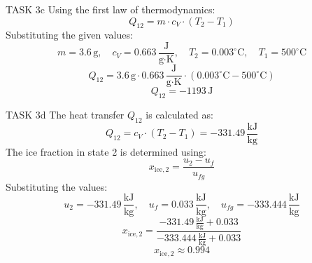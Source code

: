 TASK 3c  
Using the first law of thermodynamics:  
\[
Q_{12} = m \cdot c_V \cdot (T_2 - T_1)
\]  
Substituting the given values:  
\[
m = 3.6 \, \text{g}, \quad c_V = 0.663 \, \frac{\text{J}}{\text{g·K}}, \quad T_2 = 0.003^\circ\text{C}, \quad T_1 = 500^\circ\text{C}
\]  
\[
Q_{12} = 3.6 \, \text{g} \cdot 0.663 \, \frac{\text{J}}{\text{g·K}} \cdot (0.003^\circ\text{C} - 500^\circ\text{C})
\]  
\[
Q_{12} = -1193 \, \text{J}
\]  

TASK 3d  
The heat transfer \( Q_{12} \) is calculated as:  
\[
Q_{12} = c_V \cdot (T_2 - T_1) = -331.49 \, \frac{\text{kJ}}{\text{kg}}
\]  
The ice fraction in state 2 is determined using:  
\[
x_{\text{ice},2} = \frac{u_2 - u_f}{u_{fg}}
\]  
Substituting the values:  
\[
u_2 = -331.49 \, \frac{\text{kJ}}{\text{kg}}, \quad u_f = 0.033 \, \frac{\text{kJ}}{\text{kg}}, \quad u_{fg} = -333.444 \, \frac{\text{kJ}}{\text{kg}}
\]  
\[
x_{\text{ice},2} = \frac{-331.49 \, \frac{\text{kJ}}{\text{kg}} + 0.033}{-333.444 \, \frac{\text{kJ}}{\text{kg}} + 0.033}
\]  
\[
x_{\text{ice},2} \approx 0.994
\]